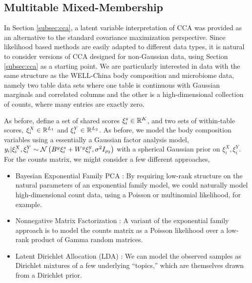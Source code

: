 \documentclass[14pt]{extarticle}
\begin{document}
\subsection{Multitable Mixed-Membership}
\label{subsec:multitable_mixed_membership}

In Section \ref{subsec:cca}, a latent variable interpretation of CCA was
provided as an alternative to the standard covariance maximization perspective.
Since likelihood based methods are easily adapted to different data types, it is
natural to consider versions of CCA designed for non-Gaussian data, using
Section \ref{subsec:cca} as a starting point. We are particularly interested in
data with the same structure as the WELL-China body composition and microbiome
data, namely two table data sets where one table is continuous with Gaussian
marginals and correlated columns and the other is a high-dimensional collection
of counts, where many entries are exactly zero.

As before, define a set of shared scores $\xi_{i}^{s} \in \mathbb{R}^{K}$, and two
sets of within-table scores, $\xi_{i}^{X} \in \mathbb{R}^{L_{1}}$ and $\xi_{i}^{Y}
\in \mathbb{R}^{L_{2}}$. As before, we model the body composition variables using a
essentially a Gaussian factor analysis model, $y_{i} \vert \xi_{i}^{X},
\xi_{i}^{Y} \sim \mathcal{N}\left(B^{y}\xi_{i}^s + W^y \xi_{i}^y,
\sigma^{2}I_{p_{2}}\right)$ with a spherical Gaussian prior on $\xi_{i}^{X},
\xi_{i}^{Y}$. For the counts matrix, we might consider a few different
approaches,

\begin{itemize}
\item Bayesian Exponential Family PCA \citep{mohamed2009bayesian}: By requiring
  low-rank structure on the natural parameters of an exponential family model,
  we could naturally model high-dimensional count data, using a Poisson or
  multinomial likelihood, for example.
\item Nonnegative Matrix Factorization \citep{lee2001algorithms}: A variant of
  the exponential family approach is to model the counts matrix as a Poisson
  likelihood over a low-rank product of Gamma random matrices.
\item Latent Dirichlet Allocation (LDA) \citep{blei2003latent}: We can model the
  observed samples as Dirichlet mixtures of a few underlying ``topics,'' which
  are themselves drawn from a Dirichlet prior.
\end{itemize}
\end{document}
